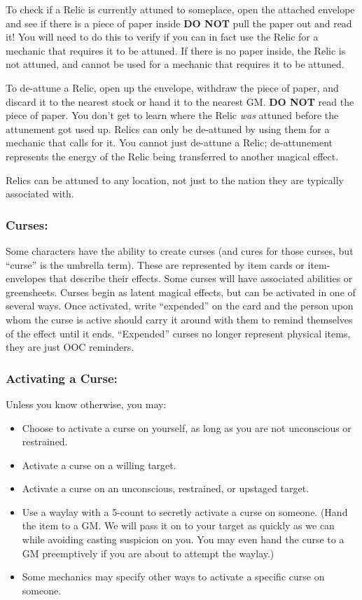 \documentclass[sheet]{GL2020}
\begin{document}
{To check if a Relic is currently attuned to someplace, open the attached envelope and see if there is a piece of paper inside \textbf{DO NOT} pull the paper out and read it! You will need to do this to verify if you can in fact use the Relic for a mechanic that requires it to be attuned. If there is no paper inside, the Relic is not attuned, and cannot be used for a mechanic that requires it to be attuned.

To de-attune a Relic, open up the envelope, withdraw the piece of paper, and discard it to the nearest stock or hand it to the nearest GM. \textbf{DO NOT} read the piece of paper. You don’t get to learn where the Relic \emph{was} attuned before the attunement got used up. Relics can only be de-attuned by using them for a mechanic that calls for it. You cannot just de-attune a Relic; de-attunement represents the energy of the Relic being transferred to another magical effect.

Relics can be attuned to any location, not just to the nation they are typically associated with.

\subsubsection{Curses:}
Some characters have the ability to create curses (and cures for those curses, but ``curse'' is the umbrella term). These are represented by item cards or item-envelopes that describe their effects. Some curses will have associated abilities or greensheets. Curses begin as latent magical effects, but can be activated in one of several ways. Once activated, write ``expended'' on the card and the person upon whom the curse is active should carry it around with them to remind themselves of the effect until it ends. ``Expended'' curses no longer represent physical items, they are just OOC reminders.

\subsubsection{Activating a Curse:}
Unless you know otherwise, you may:
\begin{itemize}
	\item Choose to activate a curse on yourself, as long as you are not unconscious or restrained.
	\item Activate a curse on a willing target. 
	\item Activate a curse on an unconscious, restrained, or upstaged target.
	\item Use a waylay with a 5-count to secretly activate a curse on someone. (Hand the item to a GM. We will pass it on to your target as quickly as we can while avoiding casting suspicion on you. You may even hand the curse to a GM preemptively if you are about to attempt the waylay.)
	\item Some mechanics may specify other ways to activate a specific curse on someone.
\end{itemize}

}
\end{document}
